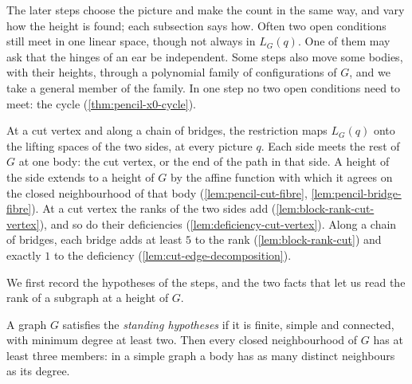 The later steps choose the picture and make the count in the same way,
and vary how the height is found; each subsection says how. Often two
open conditions still meet in one linear space, though not always in
$L_G(q)$. One of them may ask that the hinges of an ear be independent.
Some steps also move some bodies, with their heights, through a
polynomial family of configurations of $G$, and we take a general member
of the family. In one step no two open conditions need to meet: the
cycle (\cref{thm:pencil-x0-cycle}).

At a cut vertex and along a chain of bridges, the restriction maps
$L_G(q)$ onto the lifting spaces of the two sides, at every picture $q$.
Each side meets the rest of $G$ at one body: the cut vertex, or the end
of the path in that side. A height of the side extends to a height of
$G$ by the affine function with which it agrees on the closed
neighbourhood of that body (\cref{lem:pencil-cut-fibre},
\cref{lem:pencil-bridge-fibre}). At a cut vertex the ranks of the two
sides add (\cref{lem:block-rank-cut-vertex}), and so do their
deficiencies (\cref{lem:deficiency-cut-vertex}). Along a chain of
bridges, each bridge adds at least $5$ to the rank
(\cref{lem:block-rank-cut}) and exactly $1$ to the deficiency
(\cref{lem:cut-edge-decomposition}).

We first record the hypotheses of the steps, and the two facts that let
us read the rank of a subgraph at a height of $G$.

\begin{definition}
  \label{def:pencil-x0-standing}
  \leanok
  A graph $G$ satisfies the \emph{standing hypotheses} if it is finite,
  simple and connected, with minimum degree at least two. Then every
  closed neighbourhood of $G$ has at least three members: in a simple
  graph a body has as many distinct neighbours as its degree.
\end{definition}

